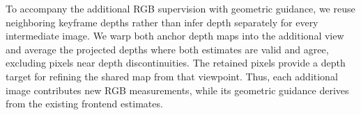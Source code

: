 To accompany the additional RGB supervision with geometric guidance, we reuse neighboring keyframe depths rather than infer depth separately for every intermediate image.
We warp both anchor depth maps into the additional view and average the projected depths where both estimates are valid and agree, excluding pixels near depth discontinuities.
The retained pixels provide a depth target for refining the shared map from that viewpoint.
Thus, each additional image contributes new RGB measurements, while its geometric guidance derives from the existing frontend estimates.

